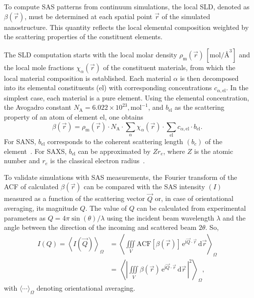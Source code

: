 \documentclass[preprint, 5p, times, twocolumn]{elsarticle}
\begin{document}
To compute SAS patterns from continuum simulations, the local SLD, denoted as $\beta(\vec{r})$, must be determined at each spatial point $\vec{r}$ of the simulated nanostructure. This quantity reflects the local elemental composition weighted by the scattering properties of the constituent elements. 

The SLD computation starts with the local molar density $\rho_{\text{m}}(\vec{r})\,[\text{mol}/\text{\AA}^3]$ and the local mole fractions $\chi_{\alpha}(\vec{r})$ of the constituent materials, from which the local material composition is established. Each material $\alpha$ is then decomposed into its elemental constituents (el) with corresponding concentrations $c_{\alpha, \text{el}}$. In the simplest case, each material is a pure element. Using the elemental concentration, the Avogadro constant $N_{\text{A}}=6.022\times10^{23},\text{mol}^{-1}$, and $b_{\text{el}}$ as the scattering property of an atom of element el, one obtains
%
\begin{equation}
    \label{eqn:SLD_cal}
    \beta(\vec{r})= \rho_{\text{m}}(\vec{r}) \cdot N_{\text{A}} \cdot
    \sum_{\alpha} \chi_{\alpha}(\vec{r}) \cdot
    \sum_{\text{el}} c_{\alpha, \text{el}} \cdot b_{\text{el}} .
\end{equation}
%
For SANS, $b_{\text{el}}$ corresponds to the coherent scattering length $(b_c)$ of the element~\cite{NIST}. For SAXS, $b_{\text{el}}$ can be approximated by $Z r_e$, where $Z$ is the atomic number and $r_e$ is the classical electron radius~\cite{NIST}.

To validate simulations with SAS measurements, the Fourier transform of the ACF of calculated $\beta(\vec{r})$ can be compared with the SAS intensity $(I)$ measured as a function of the scattering vector $\vec{Q}$ or, in case of orientational averaging, its magnitude $Q$. The value of $Q$ can be calculated from experimental parameters as $Q=4\pi \sin(\theta)/\lambda$ using the incident beam wavelength $\lambda$ and the angle between the direction of the incoming and scattered beam $2\theta$. So, 
%
\begin{equation}
\begin{split}
    \label{eqn:SANS_cont}
    I(Q) = \left\langle I(\vec{Q}) \right\rangle_{\Omega} &= \left\langle\iiint\limits_V \text{ACF}[\beta(\vec{r})]\,\mathrm{e}^{\mathrm{i} \vec{Q} \cdot \vec{r}}\,\mathrm{d}\vec{r}\right\rangle_{\Omega}\\
         &=\,\left\langle\left|\iiint\limits_V \beta(\vec{r})\,\mathrm{e}^{\mathrm{i} \vec{Q} \cdot \vec{r}}\,\mathrm{d}\vec{r}\,\right|^2\right\rangle_{\Omega},
\end{split}
\end{equation}
%
with $\langle\cdots\rangle_{\Omega}$ denoting orientational averaging. 
\end{document}
